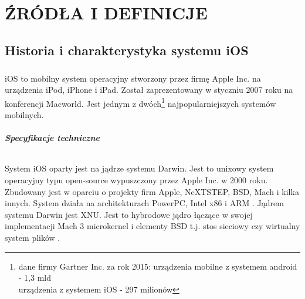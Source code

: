 \documentclass[12pt,oneside,a4paper]{report}
\begin{document}
\chapter{ŹRÓDŁA I DEFINICJE}
\section{Historia i charakterystyka systemu iOS}
\paragraph{}iOS to mobilny system operacyjny stworzony przez firmę Apple Inc. na urządzenia iPod, iPhone i iPad. Został zaprezentowany w styczniu 2007 roku na konferencji Macworld. Jest jednym z dwóch\footnote{dane firmy Gartner Inc. za rok 2015: urządzenia mobilne z systemem android - 1,3 mld \\ urządzenia z systemem iOS - 297 milionów} najpopularniejszych systemów mobilnych. 
\paragraph{Specyfikacje techniczne}
\subparagraph{}System iOS oparty jest na jądrze systemu Darwin. Jest to unixowy system operacyjny typu open-source wypuszczony przez Apple Inc. w 2000 roku. Zbudowany jest w oparciu o projekty firm Apple, NeXTSTEP, BSD, Mach i kilka innych. System działa na architekturach PowerPC, Intel x86 i ARM \cite{pureDarwin,openGroup}. 
Jądrem systemu Darwin jest XNU. Jest to hybrodowe jądro łączące w swojej implementacji Mach 3 microkernel i elementy BSD t.j. stos sieciowy czy wirtualny system plików \cite{XNUkernel}.
\end{document}
